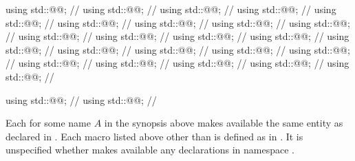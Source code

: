 \begin{codeblock}
using std::@@;                          // \seebelow
using std::@@;                                  // \seebelow
using std::@@;                         // \seebelow
using std::@@;                                 // \seebelow
using std::@@;                        // \seebelow
using std::@@;                              // \seebelow
using std::@@;                     // \seebelow
using std::@@;               // \seebelow
using std::@@;      // \seebelow
using std::@@;                 // \seebelow
using std::@@;        // \seebelow
using std::@@;                             // \seebelow
using std::@@;                    // \seebelow
using std::@@;                             // \seebelow
using std::@@;                    // \seebelow
using std::@@;                              // \seebelow
using std::@@;                     // \seebelow
using std::@@;                             // \seebelow
using std::@@;                    // \seebelow
using std::@@;                     // \seebelow
using std::@@;            // \seebelow
using std::@@;                            // \seebelow
using std::@@;                   // \seebelow

using std::@@;                          // \seebelow
using std::@@;                          // \seebelow
\end{codeblock}

\pnum
Each  for some name $A$ in the synopsis above
makes available the same entity as 
declared in .
Each macro listed above other than 
is defined as in .
It is unspecified whether  makes available
any declarations in namespace .

